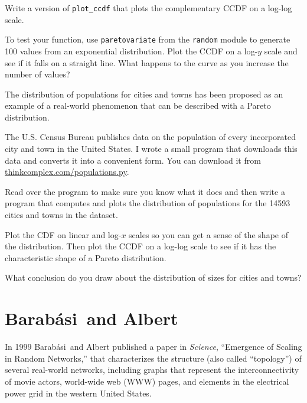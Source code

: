 \documentclass[10pt]{book}
\begin{document}
\begin{ex}

Write a version of \verb"plot_ccdf" that plots the complementary
CCDF on a log-log scale.

To test your function, use {\tt paretovariate} from the {\tt random}
module to generate 100 values from an exponential distribution.  Plot
the CCDF on a log-$y$ scale and see if it falls on a straight line.
What happens to the curve as you increase the number of values?

\end{ex}


\begin{ex}

The distribution of populations for cities and towns has been proposed
as an example of a real-world phenomenon that can be described
with a Pareto distribution.

The U.S. Census Bureau publishes data on the population of every
incorporated city and town in the United States.  I wrote a
small program that downloads this data and converts it into a
convenient form.  You can download it from
\url{thinkcomplex.com/populations.py}.  

Read over the program to make sure you know what it does and then
write a program that computes and plots the distribution of
populations for the 14593 cities and towns in the dataset.

Plot the CDF on linear and log-$x$ scales so you can get a sense of
the shape of the distribution.  Then plot the CCDF on a log-log scale
to see if it has the characteristic shape of a Pareto distribution.

What conclusion do you draw about the distribution of sizes
for cities and towns?

\end{ex}

\newcommand{\Barabasi}{Barab\'{a}si}

\section{\Barabasi~and Albert}

In 1999 \Barabasi~and Albert published a paper in {\em Science},
``Emergence of Scaling in Random Networks,''
that characterizes the structure (also called ``topology'') of
several real-world networks, including graphs that represent
the interconnectivity of movie actors, world-wide web (WWW) pages,
and elements in the electrical power grid in the western
United States.
\end{document}
